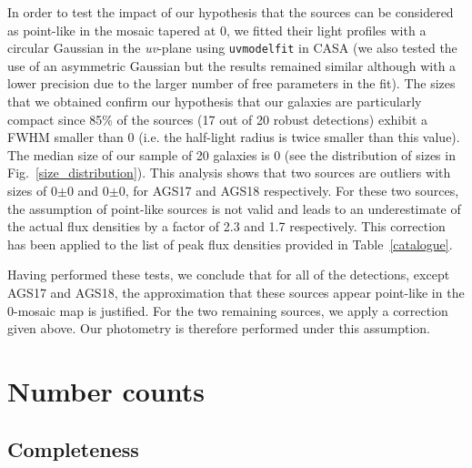 \documentclass[longauth]{aa}
\begin{document}
In order to test the impact of our hypothesis that the sources can be considered as point-like in the mosaic tapered at 0, we fitted their light profiles with a circular Gaussian in the \textit{uv}-plane using \texttt{uvmodelfit} in CASA (we also tested the use of an asymmetric Gaussian but the results remained similar although with a lower precision due to the larger number of free parameters in the fit). The sizes that we obtained confirm our hypothesis that our galaxies are particularly compact since 85\% of the sources (17 out of 20 robust detections) exhibit a FWHM smaller than 0 (i.e. the half-light radius is twice smaller than this value). The median size of our sample of 20 galaxies is 0 (see the distribution of sizes in Fig.~\ref{size_distribution}). This analysis shows that two sources are outliers with sizes of 0$\pm$0 and 0$\pm$0, for AGS17 and AGS18 respectively. For these two sources, the assumption of point-like sources is not valid and leads to an underestimate of the actual flux densities by a factor of 2.3 and 1.7 respectively. This correction has been applied to the list of peak flux densities provided in Table~\ref{catalogue}.

Having performed these tests, we conclude that for all of the detections, except AGS17 and AGS18, the approximation that these sources appear point-like in the 0-mosaic map is justified. For the two remaining sources, we apply a correction given above. Our photometry is therefore performed under this assumption.

\section{Number counts}\label{sec:Number_counts}

\subsection{Completeness}\label{sec:completeness}
\end{document}
